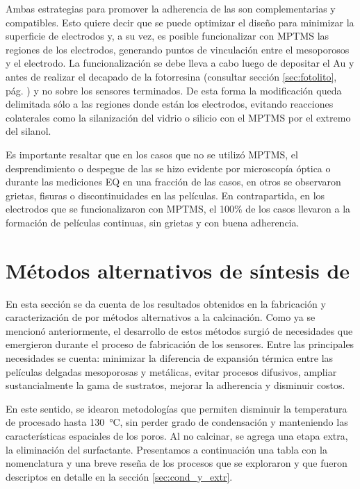 			 \pagebreak

			 Ambas estrategias para promover la adherencia de las \pdm\space son complementarias y compatibles. Esto quiere decir que se puede optimizar el diseño para minimizar la superficie de electrodos y, a su vez, es posible funcionalizar  con MPTMS las regiones de los electrodos, generando puntos de vinculación entre el mesoporosos y el electrodo. La funcionalización se debe lleva a cabo luego de depositar el Au y antes de realizar el decapado de la fotorresina (consultar sección \ref{sec:fotolito}, pág. \pageref{sec:fotolito}) y no sobre los sensores terminados. De esta forma la modificación queda delimitada sólo a las regiones donde están los electrodos, evitando reacciones colaterales como la silanización del vidrio o silicio con el MPTMS por el extremo del silanol.

			 Es importante resaltar que en los casos que no se utilizó MPTMS, el desprendimiento o despegue de las \pdm\space se hizo evidente por microscopía óptica o durante las mediciones EQ en una fracción de las casos, en otros se observaron grietas, fisuras o discontinuidades en las películas. En contrapartida, en los electrodos que se funcionalizaron con MPTMS, el 100\% de los casos llevaron a la formación de películas continuas, sin grietas y con buena adherencia.

\section{Métodos alternativos de síntesis de \pdm}
	
	 En esta sección se da cuenta de los resultados obtenidos en la fabricación y caracterización de \pdm\space por métodos alternativos a la calcinación. Como ya se mencionó anteriormente, el desarrollo de estos métodos surgió de necesidades que emergieron durante el proceso de fabricación de los sensores. Entre las principales necesidades se cuenta: minimizar la diferencia de expansión térmica entre las películas delgadas mesoporosas y metálicas, evitar procesos difusivos, ampliar sustancialmente la gama de sustratos, mejorar la adherencia y disminuir costos.

	 En este sentido, se idearon metodologías que permiten disminuir la temperatura de procesado hasta \SI{130}{\celsius}, sin perder grado de condensación y manteniendo las características espaciales de los poros. Al no calcinar, se agrega una etapa extra, la eliminación del surfactante. Presentamos a continuación una tabla con la nomenclatura y una breve reseña de los procesos que se exploraron y que fueron descriptos en detalle en la sección \ref{sec:cond_y_extr}.

